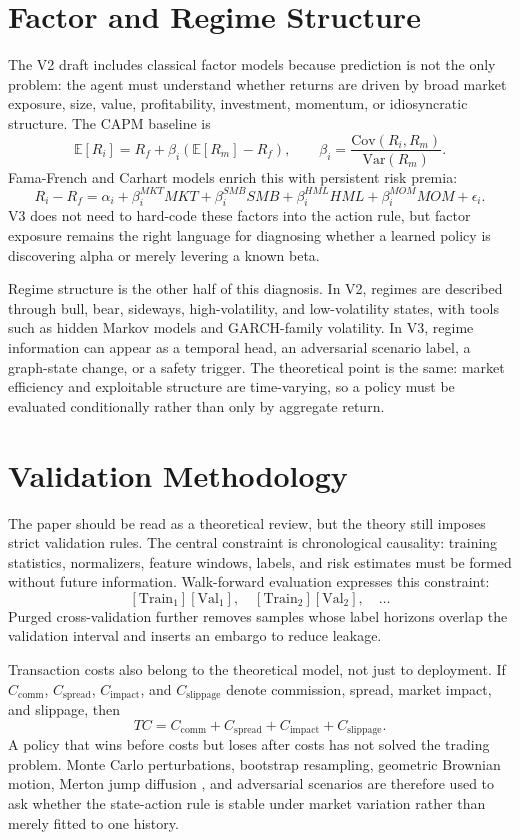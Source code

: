 \documentclass[10pt]{article}
\newcommand{\E}{\mathbb{E}}
\begin{document}
\section{Factor and Regime Structure}

The V2 draft includes classical factor models because prediction is not the only problem:
the agent must understand whether returns are driven by broad market exposure, size, value,
profitability, investment, momentum, or idiosyncratic structure. The CAPM baseline is
\[
	\E[R_i]=R_f+\beta_i(\E[R_m]-R_f),
	\qquad
	\beta_i=\frac{\mathrm{Cov}(R_i,R_m)}{\mathrm{Var}(R_m)}.
\]
Fama-French and Carhart models enrich this with persistent risk premia:
\[
	R_i-R_f
	=
	\alpha_i+\beta_i^{MKT}MKT+\beta_i^{SMB}SMB+\beta_i^{HML}HML
	+\beta_i^{MOM}MOM+\epsilon_i.
\]
V3 does not need to hard-code these factors into the action rule, but factor exposure remains
the right language for diagnosing whether a learned policy is discovering alpha or merely
levering a known beta.

Regime structure is the other half of this diagnosis. In V2, regimes are described through
bull, bear, sideways, high-volatility, and low-volatility states, with tools such as hidden
Markov models and GARCH-family volatility. In V3, regime information can appear as a temporal
head, an adversarial scenario label, a graph-state change, or a safety trigger. The theoretical
point is the same: market efficiency and exploitable structure are time-varying, so a policy
must be evaluated conditionally rather than only by aggregate return.

\section{Validation Methodology}

The paper should be read as a theoretical review, but the theory still imposes strict
validation rules. The central constraint is chronological causality: training statistics,
normalizers, feature windows, labels, and risk estimates must be formed without future
information. Walk-forward evaluation expresses this constraint:
\[
	[\mathrm{Train}_1][\mathrm{Val}_1],\quad
	[\mathrm{Train}_2][\mathrm{Val}_2],\quad \ldots
\]
Purged cross-validation \cite{delprado2018} further removes samples whose label horizons
overlap the validation interval and inserts an embargo to reduce leakage.

Transaction costs also belong to the theoretical model, not just to deployment. If
\(C_{\mathrm{comm}}\), \(C_{\mathrm{spread}}\), \(C_{\mathrm{impact}}\), and
\(C_{\mathrm{slippage}}\) denote commission, spread, market impact, and slippage, then
\[
	TC=C_{\mathrm{comm}}+C_{\mathrm{spread}}+C_{\mathrm{impact}}+C_{\mathrm{slippage}}.
\]
A policy that wins before costs but loses after costs has not solved the trading problem.
Monte Carlo perturbations, bootstrap resampling, geometric Brownian motion, Merton jump
diffusion \cite{merton1976}, and adversarial scenarios are therefore used to ask whether the
state-action rule is stable under market variation rather than merely fitted to one history.
\end{document}
